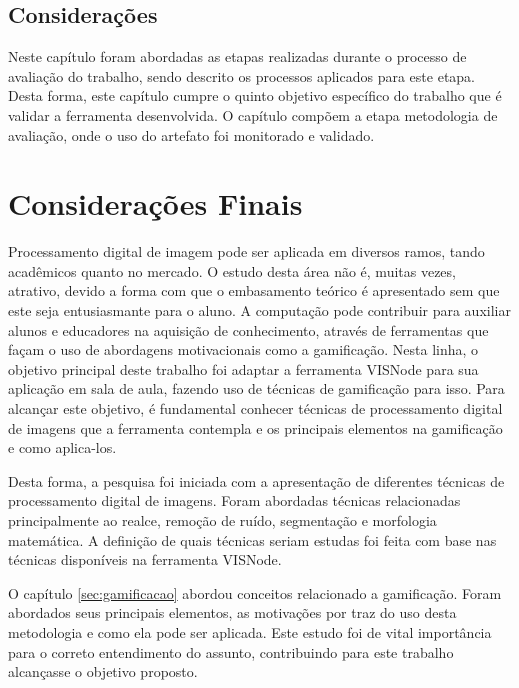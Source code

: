 \documentclass[
	12pt,				%
	oneside,			%
	a4paper,			%
	english,			%
	french,				%
	spanish,			%
	brazil,				%
	]{abntex2}
\begin{document}
\section{Considerações}

Neste capítulo foram abordadas as etapas realizadas durante o processo de avaliação do trabalho, sendo descrito os processos aplicados para este etapa. Desta forma, este capítulo cumpre o quinto objetivo específico do trabalho que é validar a ferramenta desenvolvida. O capítulo compõem a etapa metodologia de avaliação, onde o uso do artefato foi monitorado e validado.

% 

\chapter[Considerações Finais]{Considerações Finais}

Processamento digital de imagem pode ser aplicada em diversos ramos, tando acadêmicos quanto no mercado. O estudo desta área não é, muitas vezes, atrativo, devido a forma com que o embasamento teórico é apresentado sem que este seja entusiasmante para o aluno. A computação pode contribuir para auxiliar alunos e educadores na aquisição de conhecimento, através de ferramentas que façam o uso de abordagens motivacionais como a gamificação. Nesta linha, o objetivo principal deste trabalho foi adaptar a ferramenta VISNode para sua aplicação em sala de aula, fazendo uso de técnicas de gamificação para isso. Para alcançar este objetivo, é fundamental conhecer técnicas de processamento digital de imagens que a ferramenta contempla e os principais elementos na gamificação e como aplica-los.

Desta forma, a pesquisa foi iniciada com a apresentação de diferentes técnicas de processamento digital de imagens. Foram abordadas técnicas relacionadas principalmente ao realce, remoção de ruído, segmentação e morfologia matemática. A definição de quais técnicas seriam estudas foi feita com base nas técnicas disponíveis na ferramenta VISNode.

O capítulo \ref{sec:gamificacao} abordou conceitos relacionado a gamificação. Foram abordados seus principais elementos, as motivações por traz do uso desta metodologia e como ela pode ser aplicada.
Este estudo foi de vital importância para o correto entendimento do assunto, contribuindo para este trabalho alcançasse o objetivo proposto.
\end{document}
